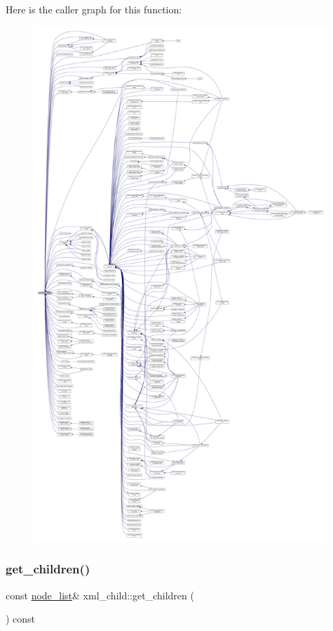 Here is the caller graph for this function\+:
\nopagebreak
\begin{figure}[H]
\begin{center}
\leavevmode
\includegraphics[height=550pt]{d7/df9/classxml__child_ac4b78d575689b828c0859d8f4f02fbac_icgraph}
\end{center}
\end{figure}
\mbox{\label{classxml__child_a689d7129c84ed308dbf89719fa0958bf}} 
\subsubsection{\texorpdfstring{get\+\_\+children()}{get\_children()}\hspace{0.1cm}{\footnotesize\ttfamily [2/2]}}
{\footnotesize\ttfamily const \hyperlink{classxml__node_a4e558f6b9e873e9d0e92cfc8e7880385}{node\+\_\+list}\& xml\+\_\+child\+::get\+\_\+children (\begin{DoxyParamCaption}{ }\end{DoxyParamCaption}) const\hspace{0.3cm}{\ttfamily [inline]}}



